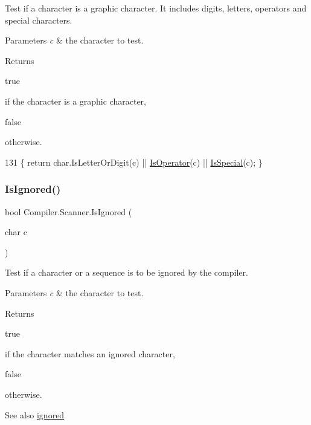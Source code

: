 Test if a character is a graphic character. It includes digits, letters, operators and special characters. 
\begin{DoxyParams}{Parameters}
{\em c} & the character to test. \\
\hline
\end{DoxyParams}
\begin{DoxyReturn}{Returns}

\begin{DoxyCode}
\textcolor{keyword}{true} 
\end{DoxyCode}
 if the character is a graphic character,
\begin{DoxyCode}
\textcolor{keyword}{false} 
\end{DoxyCode}
 otherwise. 
\end{DoxyReturn}

\begin{DoxyCode}
131 \{ \textcolor{keywordflow}{return} \textcolor{keywordtype}{char}.IsLetterOrDigit(c) || \mbox{\hyperlink{class_compiler_1_1_scanner_afbd70f210f32a803266e042bfe13e58b}{IsOperator}}(c) || \mbox{\hyperlink{class_compiler_1_1_scanner_a60cdf39c3f0fb8d97ca4b635ca2eb0c2}{IsSpecial}}(c); \}
\end{DoxyCode}
\mbox{\label{class_compiler_1_1_scanner_adb2fc8cf5a107c41d73e00eb93a98ca2}} 
\subsubsection{\texorpdfstring{Is\+Ignored()}{IsIgnored()}}
{\footnotesize\ttfamily bool Compiler.\+Scanner.\+Is\+Ignored (\begin{DoxyParamCaption}\item[{char}]{c }\end{DoxyParamCaption})\hspace{0.3cm}{\ttfamily [protected]}}

Test if a character or a sequence is to be ignored by the compiler. 
\begin{DoxyParams}{Parameters}
{\em c} & the character to test. \\
\hline
\end{DoxyParams}
\begin{DoxyReturn}{Returns}

\begin{DoxyCode}
\textcolor{keyword}{true} 
\end{DoxyCode}
 if the character matches an ignored character,
\begin{DoxyCode}
\textcolor{keyword}{false} 
\end{DoxyCode}
 otherwise. 
\end{DoxyReturn}
\begin{DoxySeeAlso}{See also}
\mbox{\hyperlink{class_compiler_1_1_scanner_afe7355d6751272f7fd901cdd885a1bd1}{ignored}} 
\end{DoxySeeAlso}

